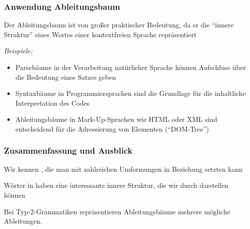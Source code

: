 \documentclass[aspectratio=1610,onlymath]{beamer}
\begin{document}
\begin{frame}\frametitle{Anwendung Ableitungsbaum}

Der Ableitungsbaum ist von großer praktischer Bedeutung, 
da er die \alert{"`innere Struktur"'} eines Wortes einer kontextfreien Sprache
repräsentiert
\bigskip

{}%
\bigskip

\emph{Beispiele:}
\begin{itemize}
\item Parsebäume in der \alert{Verarbeitung natürlicher Sprache} können Aufschluss über die Bedeutung eines Satzes geben
\item Syntaxbäume in \alert{Programmiersprachen} sind die Grundlage für die inhaltliche Interpretation des Codes
\item Ableitungsbäume in \alert{Mark-Up-Sprachen} wie HTML oder XML sind entscheidend für die Adressierung von Elementen ("`DOM-Tree"')
\end{itemize}

\end{frame}

\begin{frame}\frametitle{Zusammenfassung und Ausblick}

Wir kennen , die man mit zahlreichen Umformungen in Beziehung setzten kann\bigskip


Wörter in  haben eine interessante innere Struktur, die wir durch  darstellen können\bigskip

Bei Typ-2-Grammatiken repräsentieren Ableitungsbäume mehrere mögliche Ableitungen.\bigskip


\end{frame}
\end{document}
